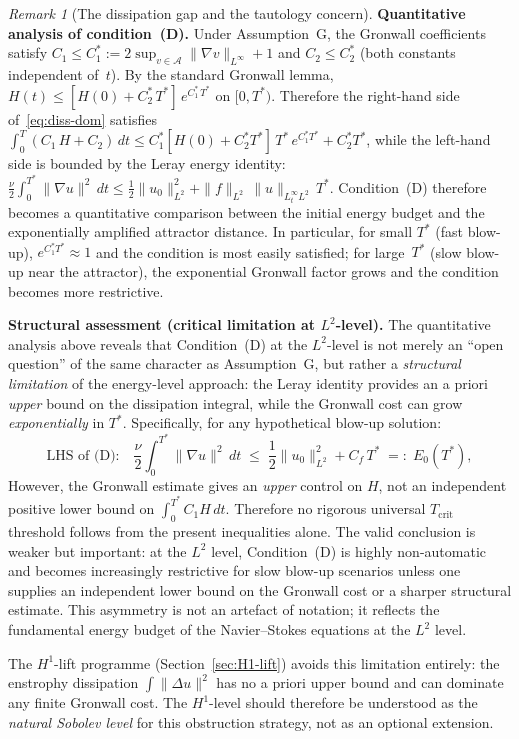 \documentclass[12pt,a4paper]{article}
\theoremstyle{definition}
\theoremstyle{plain}
\theoremstyle{remark}
\newtheorem{remark}[definition]{Remark}
\begin{document}
\begin{remark}[The dissipation gap and the tautology concern]
\medskip\noindent
\textbf{Quantitative analysis of condition~(D).}\;
Under Assumption~G, the Gronwall coefficients satisfy
$C_1 \le C_1^* := 2\sup_{v\in\mathcal{A}}\|\nabla v\|_{L^\infty}+1$
and $C_2 \le C_2^*$ (both constants independent of~$t$).
By the standard Gronwall lemma,
$H(t) \le [H(0)+C_2^*\,T^*]\,e^{C_1^*\,T^*}$
on $[0,T^*)$.  Therefore the right-hand side
of~\eqref{eq:diss-dom} satisfies
$\int_0^T(C_1\,H+C_2)\,dt
\le C_1^*[H(0)+C_2^*T^*]\,T^*\,e^{C_1^*T^*} + C_2^*T^*$,
while the left-hand side is bounded by the Leray energy identity:
$\frac{\nu}{2}\int_0^{T^*}\|\nabla u\|^2\,dt
\le \frac{1}{2}\|u_0\|^2_{L^2}
+ \|f\|_{L^2}\,\|u\|_{L^\infty_tL^2}\,T^*$.
Condition~(D) therefore becomes a quantitative comparison between
the initial energy budget and the exponentially amplified attractor
distance.  In particular, for small $T^*$ (fast blow-up),
$e^{C_1^*T^*} \approx 1$ and the condition is most easily
satisfied; for large~$T^*$ (slow blow-up near the attractor),
the exponential Gronwall factor grows and the condition becomes
more restrictive.

\medskip\noindent
\textbf{Structural assessment (critical limitation at $L^2$-level).}\;
The quantitative analysis above reveals that Condition~(D) at the
$L^2$-level is not merely an ``open question'' of the same character
as Assumption~G, but rather a \emph{structural limitation} of the
energy-level approach: the Leray identity provides an a priori
\emph{upper} bound on the dissipation integral, while the Gronwall
cost can grow \emph{exponentially} in $T^*$.  Specifically, for any
hypothetical blow-up solution:
\begin{equation}\label{eq:L2-limitation}
  \text{LHS of (D):}\quad \frac{\nu}{2}\int_0^{T^*}\|\nabla u\|^2\,dt
  \;\leq\; \frac{1}{2}\|u_0\|_{L^2}^2 + C_f\, T^*
  \;=:\; E_0(T^*),
\end{equation}
However, the Gronwall estimate gives an \emph{upper} control on $H$,
not an independent positive lower bound on
$\int_0^{T^*} C_1H\,dt$.  Therefore no rigorous universal
$T_{\mathrm{crit}}$ threshold follows from the present inequalities
alone.  The valid conclusion is weaker but important: at the $L^2$
level, Condition~(D) is highly non-automatic and becomes increasingly
restrictive for slow blow-up scenarios unless one supplies an
independent lower bound on the Gronwall cost or a sharper structural
estimate.  This asymmetry is not an artefact of notation; it reflects
the fundamental energy budget of the Navier--Stokes equations at the
$L^2$ level.

The $H^1$-lift programme (Section~\ref{sec:H1-lift}) avoids this
limitation entirely: the enstrophy dissipation $\int\|\Delta u\|^2$
has no a priori upper bound and can dominate any finite Gronwall cost.
The $H^1$-level should therefore be understood as the \emph{natural
Sobolev level} for this obstruction strategy, not as an optional
extension.
\end{remark}
\end{document}
